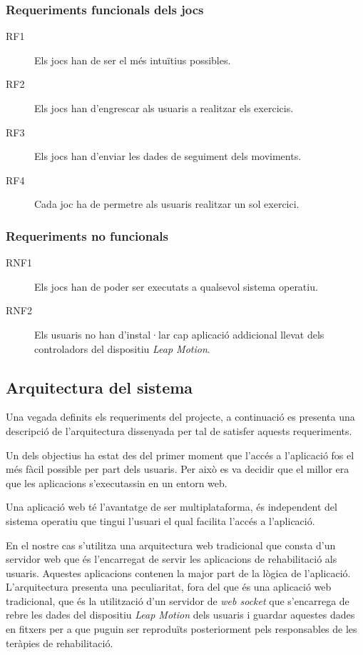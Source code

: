 \documentclass[12pt,a4paper,catalan]{article}
\begin{document}
	\subsubsection*{Requeriments funcionals dels jocs}
	\begin{description}
		\item [RF1] Els jocs han de ser el més intuïtius possibles.
		\item [RF2] Els jocs han d'engrescar als usuaris a realitzar els exercicis.
		\item [RF3] Els jocs han d'enviar les dades de seguiment dels moviments.
		\item [RF4] Cada joc ha de permetre als usuaris realitzar un sol exercici.
	\end{description}
	\subsubsection*{Requeriments no funcionals}
	\begin{description}
		\item [RNF1] Els jocs han de poder ser executats a qualsevol sistema operatiu.
		\item [RNF2] Els usuaris no han d'instal·lar cap aplicació addicional llevat dels controladors del dispositiu \textit{Leap Motion}.
	\end{description}
	\subsection{Arquitectura del sistema}
	Una vegada definits els requeriments del projecte, a continuació es presenta una descripció de l'arquitectura dissenyada per tal de satisfer aquests requeriments.
	
	Un dels objectius ha estat des del primer moment que l'accés a l'aplicació fos el més fàcil possible per part dels usuaris. Per això es va decidir que el millor era que les aplicacions s'executassin en un entorn web.
	
	Una aplicació web té l'avantatge de ser multiplataforma, és independent del sistema operatiu que tingui l'usuari el qual facilita l'accés a l'aplicació.
	
	En el nostre cas s'utilitza una arquitectura web tradicional que consta d'un servidor web que és l'encarregat de servir les aplicacions de rehabilitació als usuaris. Aquestes aplicacions contenen la major part de la lògica de l'aplicació. L'arquitectura presenta una peculiaritat, fora del que és una aplicació web tradicional, que és la utilització d'un servidor de \textit{web socket} que s'encarrega de rebre les dades del dispositiu \textit{Leap Motion} dels usuaris i guardar aquestes dades en fitxers per a que puguin ser reproduïts posteriorment pels responsables de les teràpies de rehabilitació.
	
\end{document}
